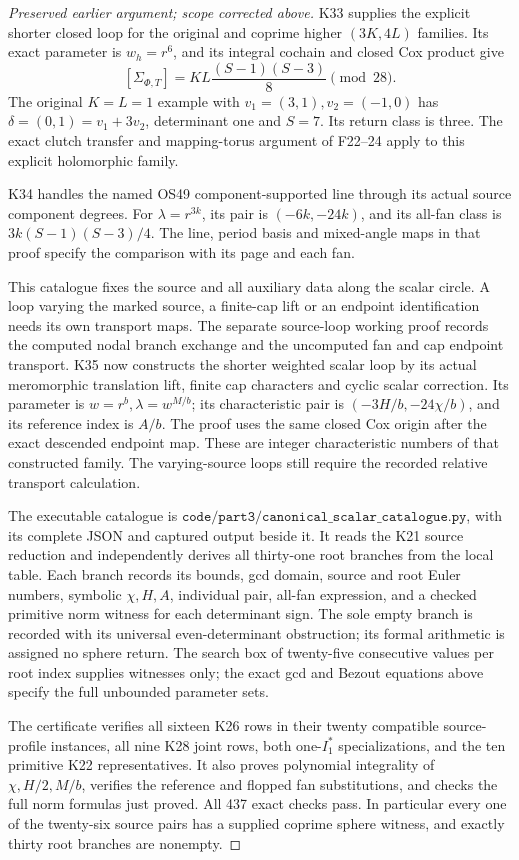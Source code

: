 \begin{proof}[Preserved earlier argument; scope corrected above]
\par\nobreak

K33 supplies the explicit shorter closed
loop for the original and coprime higher
\((3K,4L)\) families. Its exact parameter
is \(w_h=r^6\), and its integral cochain
and closed Cox product give
\[
 [\Sigma_{\Phi,T}]
       =KL\frac{(S-1)(S-3)}8 \pmod {28}.
\]
The original \(K=L=1\) example with
\(v_1=(3,1),v_2=(-1,0)\) has
\(\delta=(0,1)=v_1+3v_2\), determinant
one and \(S=7\). Its return class is
three. The exact clutch transfer and
mapping-torus argument of F22--24 apply
to this explicit holomorphic family.

K34 handles the named OS49
component-supported line through its
actual source component degrees. For
\(\lambda=r^{3k}\), its pair is
\((-6k,-24k)\), and its all-fan class
is \(3k(S-1)(S-3)/4\). The line,
period basis and mixed-angle maps
in that proof specify the comparison
with its page and each fan.

This catalogue fixes the source and
all auxiliary data along the scalar
circle. A loop varying the marked
source, a finite-cap lift or an
endpoint identification needs its
own transport maps. The separate
source-loop working proof records
the computed nodal branch exchange
and the uncomputed fan and cap
endpoint transport. K35 now constructs the shorter
weighted scalar loop by its actual
meromorphic translation lift, finite
cap characters and cyclic scalar
correction. Its parameter is
\(w=r^b,\lambda=w^{M/b}\); its
characteristic pair is
\((-3H/b,-24\chi/b)\), and its
reference index is \(A/b\).
The proof uses the same closed Cox
origin after the exact descended
endpoint map. These are integer
characteristic numbers of that
constructed family. The varying-source
loops still require the recorded
relative transport calculation.

The executable catalogue is
\(\texttt{code/part3/canonical\_scalar\_catalogue.py}\),
with its complete JSON and captured output beside it.
It reads the K21 source reduction and independently
derives all thirty-one root branches from the local
table. Each branch records its bounds, gcd domain,
source and root Euler numbers, symbolic
\(\chi,H,A\), individual pair, all-fan expression,
and a checked primitive norm witness for each
determinant sign. The sole empty branch is recorded
with its universal even-determinant obstruction;
its formal arithmetic is assigned no sphere return.
The search box of twenty-five consecutive values
per root index supplies witnesses only; the exact
gcd and Bezout equations above specify the full
unbounded parameter sets.

The certificate verifies all sixteen K26 rows in
their twenty compatible source-profile instances,
all nine K28 joint rows, both one-\(I_1^*\)
specializations, and the ten primitive K22
representatives. It also proves polynomial
integrality of \(\chi,H/2,M/b\), verifies
the reference and flopped fan substitutions, and
checks the full norm formulas just proved.
All 437 exact checks pass. In particular every
one of the twenty-six source pairs has a supplied
coprime sphere witness, and exactly thirty
root branches are nonempty.
\end{proof}
